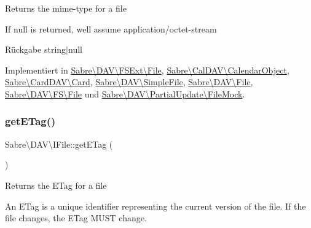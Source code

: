 Returns the mime-\/type for a file

If null is returned, we\textquotesingle{}ll assume application/octet-\/stream

\begin{DoxyReturn}{Rückgabe}
string$\vert$null 
\end{DoxyReturn}


Implementiert in \mbox{\hyperlink{class_sabre_1_1_d_a_v_1_1_f_s_ext_1_1_file_a0a37951c9e67dde2cd9c33c67015614d}{Sabre\textbackslash{}\+D\+A\+V\textbackslash{}\+F\+S\+Ext\textbackslash{}\+File}}, \mbox{\hyperlink{class_sabre_1_1_cal_d_a_v_1_1_calendar_object_a73609b33bcf07b1460038bb125b9d013}{Sabre\textbackslash{}\+Cal\+D\+A\+V\textbackslash{}\+Calendar\+Object}}, \mbox{\hyperlink{class_sabre_1_1_card_d_a_v_1_1_card_a236500a390730115bf035c20ff78b3d9}{Sabre\textbackslash{}\+Card\+D\+A\+V\textbackslash{}\+Card}}, \mbox{\hyperlink{class_sabre_1_1_d_a_v_1_1_simple_file_af7db06a30e0b3557c488d2608a2c0523}{Sabre\textbackslash{}\+D\+A\+V\textbackslash{}\+Simple\+File}}, \mbox{\hyperlink{class_sabre_1_1_d_a_v_1_1_file_af691c1f6e2de8640042b2a75181c4af5}{Sabre\textbackslash{}\+D\+A\+V\textbackslash{}\+File}}, \mbox{\hyperlink{class_sabre_1_1_d_a_v_1_1_f_s_1_1_file_aca06c255562df9fc5b200760d29424d2}{Sabre\textbackslash{}\+D\+A\+V\textbackslash{}\+F\+S\textbackslash{}\+File}} und \mbox{\hyperlink{class_sabre_1_1_d_a_v_1_1_partial_update_1_1_file_mock_a579203d7c6b0516a0fe0bd27f83ff275}{Sabre\textbackslash{}\+D\+A\+V\textbackslash{}\+Partial\+Update\textbackslash{}\+File\+Mock}}.

\mbox{\label{interface_sabre_1_1_d_a_v_1_1_i_file_a2b207a6037dcbd4e7373b977dc60117f}} 
\subsubsection{\texorpdfstring{get\+E\+Tag()}{getETag()}}
{\footnotesize\ttfamily Sabre\textbackslash{}\+D\+A\+V\textbackslash{}\+I\+File\+::get\+E\+Tag (\begin{DoxyParamCaption}{ }\end{DoxyParamCaption})}

Returns the E\+Tag for a file

An E\+Tag is a unique identifier representing the current version of the file. If the file changes, the E\+Tag M\+U\+ST change.

